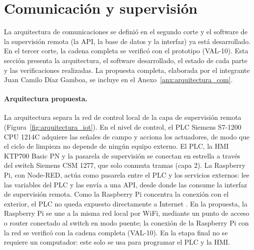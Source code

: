 
\section{Comunicación y supervisión}\label{sec:montaje_comunicaciones}

La arquitectura de comunicaciones se definió en el segundo corte y el software de la supervisión remota (la API, la base de datos y la interfaz) ya está desarrollado. En el tercer corte, la cadena completa se verificó con el prototipo (VAL-10). Esta sección presenta la arquitectura, el software desarrollado, el estado de cada parte y las verificaciones realizadas. La propuesta completa, elaborada por el integrante Juan Camilo Díaz Gamboa, se incluye en el Anexo~\ref{anx:arquitectura_com}.

\paragraph{Arquitectura propuesta.} La arquitectura separa la red de control local de la capa de supervisión remota (Figura~\ref{fig:arquitectura_iot}). En el nivel de control, el PLC Siemens S7-1200 CPU 1214C adquiere las señales de campo y acciona los actuadores, de modo que el ciclo de limpieza no depende de ningún equipo externo. El PLC, la HMI KTP700 Basic PN y la pasarela de supervisión se conectan en estrella a través del switch Siemens CSM 1277, que solo conmuta tramas (capa 2). La Raspberry Pi, con Node-RED, actúa como pasarela entre el PLC y los servicios externos: lee las variables del PLC y las envía a una API, desde donde las consume la interfaz de supervisión remota. Como la Raspberry Pi concentra la conexión con el exterior, el PLC no queda expuesto directamente a Internet \cite{hajda2021security}. En la propuesta, la Raspberry Pi se une a la misma red local por WiFi, mediante un punto de acceso o router conectado al switch en modo puente; la conexión de la Raspberry Pi con la red se verificó con la cadena completa (VAL-10). En la etapa final no se requiere un computador: este solo se usa para programar el PLC y la HMI.

